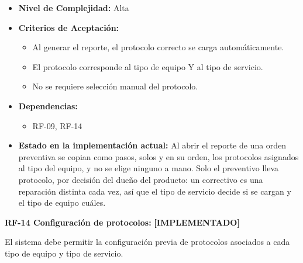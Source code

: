 \documentclass[12pt,a4paper]{article}
\newcommand{\estadoImplementado}{\textcolor{mainRed}{\textbf{[IMPLEMENTADO]}}}
\begin{document}
\begin{itemize}
  \item \textbf{Nivel de Complejidad:} Alta

  \item \textbf{Criterios de Aceptación:}
  \begin{itemize}
    \item Al generar el reporte, el protocolo correcto se carga automáticamente.
    \item El protocolo corresponde al tipo de equipo Y al tipo de servicio.
    \item No se requiere selección manual del protocolo.
  \end{itemize}

  \item \textbf{Dependencias:}
  \begin{itemize}
    \item RF-09, RF-14
  \end{itemize}

  \item \textbf{Estado en la implementación actual:} Al abrir el reporte de una orden preventiva se copian como pasos, solos y en su orden, los protocolos asignados al tipo del equipo, y no se elige ninguno a mano. Solo el preventivo lleva protocolo, por decisión del dueño del producto: un correctivo es una reparación distinta cada vez, así que el tipo de servicio decide si se cargan y el tipo de equipo cuáles.
\end{itemize}

\textbf{RF-14 Configuración de protocolos:} \estadoImplementado{}

El sistema debe permitir la configuración previa de protocolos asociados a cada tipo de equipo y tipo de servicio.
\end{document}
